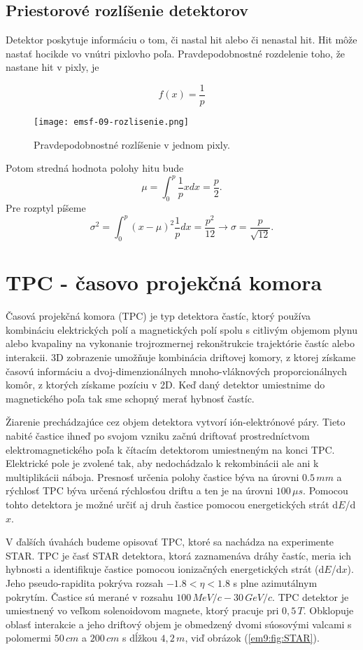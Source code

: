 \documentclass[../../main.tex]{subfiles}
\begin{document}
\subsection{Priestorové rozlíšenie detektorov} 
Detektor poskytuje informáciu o tom, či nastal hit alebo či nenastal hit. Hit môže nastať hocikde vo vnútri pixlovho poľa. Pravdepodobnostné rozdelenie toho, že nastane hit v pixly, je 

$$ f(x) = \frac{1}{p} $$

\begin{figure}[!h]
\texttt{[image: emsf-09-rozlisenie.png]}
\centering
\caption{Pravdepodobnostné rozlíšenie v jednom pixly.}
\label{em9:fig:rozlisenie}
\end{figure}

Potom stredná hodnota polohy hitu bude 
$$ \mu = \int_0^p \frac{1}{p}x dx  = \frac{p}{2}.$$
Pre rozptyl píšeme 
$$ \sigma^2 = \int_0^p (x-\mu)^2 \frac{1}{p}dx = \frac{p^2}{12} \rightarrow \sigma = \frac{p}{\sqrt{12}}.$$

\section{TPC - časovo projekčná komora}
Časová projekčná komora (TPC) je typ detektora častíc, ktorý používa kombináciu elektrických polí a magnetických polí spolu s citlivým objemom plynu alebo kvapaliny na vykonanie trojrozmernej rekonštrukcie trajektórie častíc alebo interakcii. 3D zobrazenie umožňuje kombinácia driftovej komory, z ktorej získame časovú informáciu a dvoj-dimenzionálnych mnoho-vláknových proporcionálnych komôr, z ktorých získame pozíciu v 2D. Keď daný detektor umiestnime do magnetického poľa tak sme schopný merať hybnosť častíc.

Žiarenie prechádzajúce cez objem detektora vytvorí ión-elektrónové páry. Tieto nabité častice ihneď po svojom vzniku začnú driftovať prostredníctvom elektromagnetického poľa k čítacím detektorom umiestneným na konci TPC. Elektrické pole je zvolené tak, aby nedochádzalo k rekombinácii ale ani k multiplikácii náboja. Presnosť určenia polohy častice býva na úrovni $0.5\,\unit{mm}$ a rýchlosť TPC býva určená rýchlosťou driftu a ten je na úrovni $100\,\unit{\mu s}$. Pomocou tohto detektora je možné určiť aj druh častice pomocou energetických strát d$E$/d$x$.


V ďalších úvahách budeme opisovať TPC, ktoré sa nachádza na experimente STAR. TPC je časť STAR detektora, ktorá zaznamenáva dráhy častíc, meria ich hybnosti a identifikuje častice pomocou ionizačných energetických strát (d$E$/d$x$). Jeho pseudo-rapidita pokrýva rozsah $-1.8 < \eta <1.8$ s plne azimutálnym pokrytím. Častice sú merané v rozsahu $100\,\unit{MeV}/c - 30\,\unit{GeV}/c$. TPC detektor je umiestnený vo veľkom solenoidovom magnete, ktorý pracuje pri $0,5\,\unit{T}$. Obklopuje oblasť interakcie a jeho driftový objem je obmedzený dvomi súosovými valcami s polomermi $50\,\unit{cm}$ a $200\,\unit{cm}$ s dĺžkou $4,2\,\unit{m}$, viď obrázok (\ref{em9:fig:STAR}). 
\end{document}
